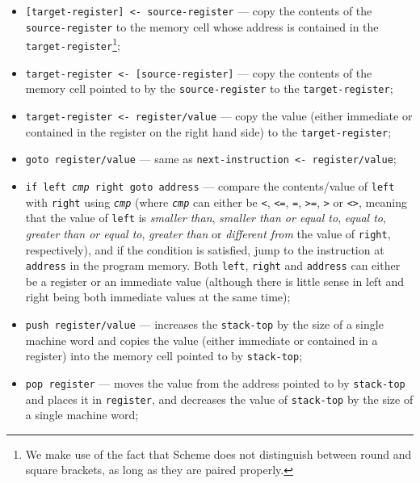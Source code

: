 \begin{itemize}
\item \texttt{[target-register] <- source-register} --- copy the contents
  of the \texttt{source-register} to the memory cell whose address
  is contained in the \texttt{target-register}\footnote{We make use of
    the fact that Scheme does not distinguish between round and square
    brackets, as long as they are paired properly.};

\item \texttt{target-register <- [source-register]} --- copy the
  contents of the memory cell pointed to by the \texttt{source-register}
  to the \texttt{target\--register};

\item \texttt{target-register <- register/value} --- copy the
  value (either immediate or contained in the register on the right
  hand side) to the \texttt{target-register};
  
\item \texttt{goto register/value} --- same as
  \texttt{next-instruction <- re\-gi\-ster\-/value};

\item \texttt{if left \textit{cmp} right goto address}
  --- compare the contents/value of \texttt{left}
  with \texttt{right} using \texttt{\textit{cmp}}
  (where \texttt{\textit{cmp}} can either
  be \texttt{<}, \texttt{<=}, \texttt{=}, \texttt{>=}, \texttt{>} or \texttt{<>},
  meaning that the value of \texttt{left} is \textit{smaller than},
  \textit{smaller than or equal to}, \textit{equal to},
  \textit{greater than or equal to}, \textit{greater than} or
  \textit{different from} the value of \texttt{right},
  respectively), and if the condition is satisfied, jump to the
  instruction at \texttt{address} in the program memory. Both
  \texttt{left}, \texttt{right} and \texttt{address} can either
  be a register or an immediate value (although there is little
  sense in left and right being both immediate values at the same time);
  
\item \texttt{push register/value} --- increases the \texttt{stack-top}
  by the size of a single machine word and copies the value
  (either immediate or contained in a register) into the memory
  cell pointed to by \texttt{stack-top};
  
\item \texttt{pop register} --- moves the value from the address pointed
  to by \texttt{stack-top} and places it in \texttt{register}, and
  decreases the value of \texttt{stack-top} by the size of a single
  machine word;


\end{itemize}
